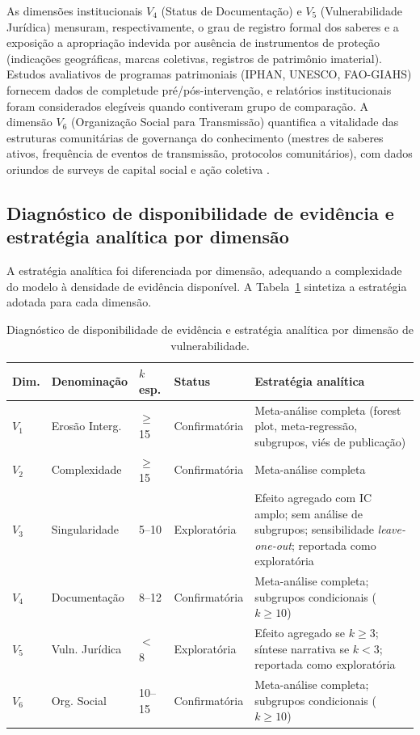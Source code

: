 As dimensões institucionais $V_4$ (Status de Documentação) e $V_5$ (Vulnerabilidade Jurídica) mensuram, respectivamente, o grau de registro formal dos saberes e a exposição a apropriação indevida por ausência de instrumentos de proteção (indicações geográficas, marcas coletivas, registros de patrimônio imaterial). Estudos avaliativos de programas patrimoniais (IPHAN, UNESCO, FAO-GIAHS) fornecem dados de completude pré/pós-intervenção, e relatórios institucionais foram considerados elegíveis quando contiveram grupo de comparação. A dimensão $V_6$ (Organização Social para Transmissão) quantifica a vitalidade das estruturas comunitárias de governança do conhecimento (mestres de saberes ativos, frequência de eventos de transmissão, protocolos comunitários), com dados oriundos de surveys de capital social e ação coletiva \cite{Ostrom1990,Pretty2003}.

\subsection{Diagnóstico de disponibilidade de evidência e estratégia analítica por dimensão}
\label{sec:diagnosis_cap2}

A estratégia analítica foi diferenciada por dimensão, adequando a complexidade do modelo à densidade de evidência disponível. A Tabela~\ref{tab:viability_cap2} sintetiza a estratégia adotada para cada dimensão.

\begin{table}[htbp]
\caption{Diagnóstico de disponibilidade de evidência e estratégia analítica por dimensão de vulnerabilidade.}
\label{tab:viability_cap2}
\centering
\small
\begin{tabular}{p{0.8cm}p{2.2cm}p{1.2cm}p{2.0cm}p{5.5cm}}
\toprule
\textbf{Dim.} & \textbf{Denominação} & \textbf{$k$ esp.} & \textbf{Status} & \textbf{Estratégia analítica} \\
\midrule
$V_1$ & Erosão Interg. & $\geq$ 15 & Confirmatória & Meta-análise completa (forest plot, meta-regressão, subgrupos, viés de publicação) \\
$V_2$ & Complexidade & $\geq$ 15 & Confirmatória & Meta-análise completa \\
$V_3$ & Singularidade & 5--10 & Exploratória & Efeito agregado com IC amplo; sem análise de subgrupos; sensibilidade \textit{leave-one-out}; reportada como exploratória \\
$V_4$ & Documentação & 8--12 & Confirmatória & Meta-análise completa; subgrupos condicionais ($k \geq 10$) \\
$V_5$ & Vuln. Jurídica & $<$ 8 & Exploratória & Efeito agregado se $k \geq 3$; síntese narrativa se $k < 3$; reportada como exploratória \\
$V_6$ & Org. Social & 10--15 & Confirmatória & Meta-análise completa; subgrupos condicionais ($k \geq 10$) \\
\bottomrule
\end{tabular}
\end{table}

